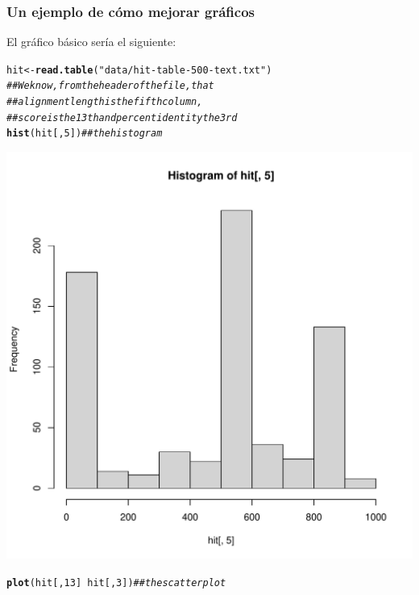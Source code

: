 \documentclass{config/apuntes}\usepackage[]{graphicx}\usepackage[]{xcolor}
\makeatletter
\def\maxwidth{ %
  \ifdim\Gin@nat@width>\linewidth
    \linewidth
  \else
    \Gin@nat@width
  \fi
}
\newcommand{\hlnum}[1]{\textcolor[rgb]{0.686,0.059,0.569}{#1}}%
\newcommand{\hlsng}[1]{\textcolor[rgb]{0.192,0.494,0.8}{#1}}%
\newcommand{\hlcom}[1]{\textcolor[rgb]{0.678,0.584,0.686}{\textit{#1}}}%
\newcommand{\hlopt}[1]{\textcolor[rgb]{0,0,0}{#1}}%
\newcommand{\hldef}[1]{\textcolor[rgb]{0.345,0.345,0.345}{#1}}%
\newcommand{\hlkwb}[1]{\textcolor[rgb]{0.69,0.353,0.396}{#1}}%
\newcommand{\hlkwd}[1]{\textcolor[rgb]{0.737,0.353,0.396}{\textbf{#1}}}%
\newenvironment{kframe}{%
 \def\at@end@of@kframe{}%
 \ifinner\ifhmode%
  \def\at@end@of@kframe{\end{minipage}}%
  \begin{minipage}{\columnwidth}%
 \fi\fi%
 \def\FrameCommand##1{\hskip\@totalleftmargin \hskip-\fboxsep
 \colorbox{shadecolor}{##1}\hskip-\fboxsep
     \hskip-\linewidth \hskip-\@totalleftmargin \hskip\columnwidth}%
 \MakeFramed {\advance\hsize-\width
   \@totalleftmargin\z@ \linewidth\hsize
   \@setminipage}}%
 {\par\unskip\endMakeFramed%
 \at@end@of@kframe}
\newenvironment{knitrout}{}{} %
\makeatother
\begin{document}
\subsubsection{Un ejemplo de cómo mejorar gráficos}
El gráfico básico sería el siguiente:
\begin{knitrout}
\color{fgcolor}\begin{kframe}
\begin{alltt}
\hldef{hit} \hlkwb{<-} \hlkwd{read.table}\hldef{(}\hlsng{"data/hit-table-500-text.txt"}\hldef{)}
\hlcom{## We know, from the header of the file, that}
\hlcom{## alignment length is the fifth column,}
\hlcom{## score is the 13th and percent identity the 3rd}
\hlkwd{hist}\hldef{(hit[,} \hlnum{5}\hldef{])} \hlcom{## the histogram}
\end{alltt}
\end{kframe}
\includegraphics[width=\maxwidth]{figure/unnamed-chunk-73-1} 
\begin{kframe}\begin{alltt}
\hlkwd{plot}\hldef{(hit[,} \hlnum{13}\hldef{]} \hlopt{~} \hldef{hit[,} \hlnum{3}\hldef{])} \hlcom{## the scatterplot}
\end{alltt}
\end{kframe}

\end{knitrout}
\end{document}
